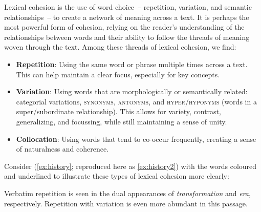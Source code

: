 Lexical cohesion is the use of word choice~-- repetition, variation, and semantic relationships~-- to create a network of meaning across a text. It is perhaps the most powerful form of cohesion, relying on the reader's understanding of the relationships between words and their ability to follow the threads of meaning woven through the text. Among these threads of lexical cohesion, we find:

\begin{itemize}[noitemsep]
    \item \textbf{Repetition}: Using the same word or phrase multiple times across a text. This can help maintain a clear focus, especially for key concepts. 
    \item \textbf{Variation}: Using words that are morphologically or semantically related: categorial variations, \textsc{synonyms}, \textsc{antonyms}, and \textsc{hyper}/\textsc{hyponyms} (words in a super/subordinate relationship). This allows for variety, contrast, generalizing, and focussing, while still maintaining a sense of unity. 
    
    \item \textbf{Collocation}: Using words that tend to co-occur frequently, creating a sense of naturalness and coherence. 
\end{itemize}

Consider (\ref{ex:history}; reproduced here as \ref{ex:history2}) with the words coloured and underlined to illustrate these types of lexical cohesion more clearly:

\label{ex:history2}
\z
Verbatim repetition is seen in the dual appearances of \textit{\textcolor{xGreen}{transformation}} and \textit{\textcolor{xGreen}{era}}, respectively. Repetition with variation is even more abundant in this passage.

